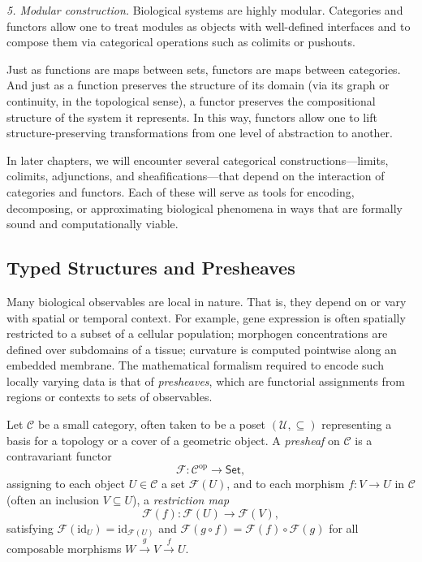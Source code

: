 {\it 5. Modular construction.} Biological systems are highly modular. Categories and functors allow one to treat modules as objects with well-defined interfaces and to compose them via categorical operations such as colimits or pushouts.

\vspace{1em}

Just as functions are maps between sets, functors are maps between categories. And just as a function preserves the structure of its domain (via its graph or continuity, in the topological sense), a functor preserves the compositional structure of the system it represents. In this way, functors allow one to lift structure-preserving transformations from one level of abstraction to another.

In later chapters, we will encounter several categorical constructions—limits, colimits, adjunctions, and sheafifications—that depend on the interaction of categories and functors. Each of these will serve as tools for encoding, decomposing, or approximating biological phenomena in ways that are formally sound and computationally viable.


\subsection{Typed Structures and Presheaves}

Many biological observables are local in nature. That is, they depend on or vary with spatial or temporal context. For example, gene expression is often spatially restricted to a subset of a cellular population; morphogen concentrations are defined over subdomains of a tissue; curvature is computed pointwise along an embedded membrane. The mathematical formalism required to encode such locally varying data is that of \emph{presheaves}, which are functorial assignments from regions or contexts to sets of observables.

\begin{definition}
Let $\mathcal{C}$ be a small category, often taken to be a poset $(\mathcal{U}, \subseteq)$ representing a basis for a topology or a cover of a geometric object. A \emph{presheaf} on $\mathcal{C}$ is a contravariant functor
\[
\mathscr{F} : \mathcal{C}^{\mathrm{op}} \to \textsf{Set},
\]
assigning to each object $U \in \mathcal{C}$ a set $\mathscr{F}(U)$, and to each morphism $f : V \to U$ in $\mathcal{C}$ (often an inclusion $V \subseteq U$), a \emph{restriction map}
\[
\mathscr{F}(f) : \mathscr{F}(U) \to \mathscr{F}(V),
\]
satisfying $\mathscr{F}(\mathrm{id}_U) = \mathrm{id}_{\mathscr{F}(U)}$ and $\mathscr{F}(g \circ f) = \mathscr{F}(f) \circ \mathscr{F}(g)$ for all composable morphisms $W \xrightarrow{g} V \xrightarrow{f} U$.
\end{definition}

